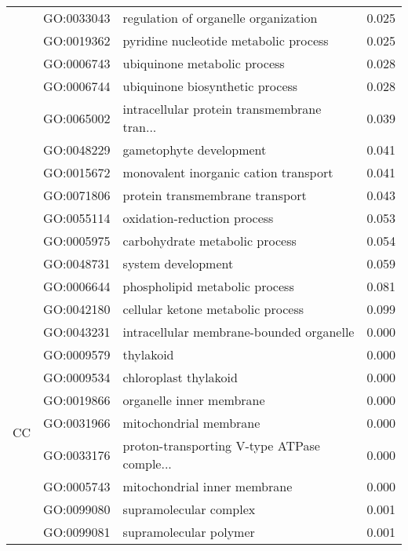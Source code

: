 \begin{longtable}{lllr}
   & GO:0033043 &         regulation of organelle organization &         0.025 \\
   & GO:0019362 &        pyridine nucleotide metabolic process &         0.025 \\
   & GO:0006743 &                 ubiquinone metabolic process &         0.028 \\
   & GO:0006744 &              ubiquinone biosynthetic process &         0.028 \\
   & GO:0065002 &  intracellular protein transmembrane tran... &         0.039 \\
   & GO:0048229 &                      gametophyte development &         0.041 \\
   & GO:0015672 &        monovalent inorganic cation transport &         0.041 \\
   & GO:0071806 &              protein transmembrane transport &         0.043 \\
   & GO:0055114 &                  oxidation-reduction process &         0.053 \\
   & GO:0005975 &               carbohydrate metabolic process &         0.054 \\
   & GO:0048731 &                           system development &         0.059 \\
   & GO:0006644 &               phospholipid metabolic process &         0.081 \\
   & GO:0042180 &            cellular ketone metabolic process &         0.099 \\
\cline{1-4}
\multirow{22}{*}{CC} & GO:0043231 &     intracellular membrane-bounded organelle &         0.000 \\
   & GO:0009579 &                                    thylakoid &         0.000 \\
   & GO:0009534 &                        chloroplast thylakoid &         0.000 \\
   & GO:0019866 &                     organelle inner membrane &         0.000 \\
   & GO:0031966 &                       mitochondrial membrane &         0.000 \\
   & GO:0033176 &  proton-transporting V-type ATPase comple... &         0.000 \\
   & GO:0005743 &                 mitochondrial inner membrane &         0.000 \\
   & GO:0099080 &                       supramolecular complex &         0.001 \\
   & GO:0099081 &                       supramolecular polymer &         0.001 \\

\end{longtable}

